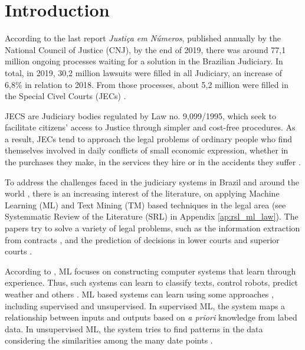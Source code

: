 \chapter{Introduction}


According to the last report \textit{Justiça em Números}, published annually by the National Council of Justice (CNJ), by the end of 2019, there was around 77,1 million ongoing processes waiting for a solution in the Brazilian Judiciary. In total, in 2019, 30,2 million lawsuits were filled in all Judiciary, an increase of 6,8\% in relation to 2018. From those processes, about 5,2 million were filled in the Special Civel Courts (JECs)  \cite{CNJ2020}. 

JECS are Judiciary bodies regulated by Law no. 9,099/1995, which seek to facilitate citizens' access to Justice through simpler and cost-free procedures. As a result, JECs tend to approach the legal problems of ordinary people who find themselves involved in daily conflicts of small economic expression, whether in the purchases they make, in the services they hire or in the accidents they suffer \cite{Watanabe1985}.

To address the challenges faced in the judiciary systems in Brazil and around the world \cite{Sadiku2020, }, there is an increasing interest of the literature,  on applying Machine Learning (ML) and Text Mining (TM) based techniques in the legal area (see Systemmatic Review of the Literature (SRL) in Appendix \ref{ap:rsl_ml_law}).  The papers try to solve a variety of legal problems, such as the information extraction from contracts \cite{Hassan2020}, and the prediction of decisions in lower courts and superior courts \cite{Sulea2017,  Virtucio2018}. 

According to \textcite{Mitchell1997}, ML focuses on constructing computer systems that learn through experience. Thus, such systems can learn to classify texts, control robots, predict weather and others \cite{Sebastiani2002, Kober2013, Shi2015}. ML based systems can learn using some approaches \cite{Schmidhuber2015, Caruana1997}, including supervised and unsupervised. In supervised ML, the system maps a relationship between inputs and outputs based on \textit{a priori} knowledge from labed data. In unsupervised ML, the system tries to find patterns in the data considering the similarities among the many date points \cite{Theodoridis2009}.

